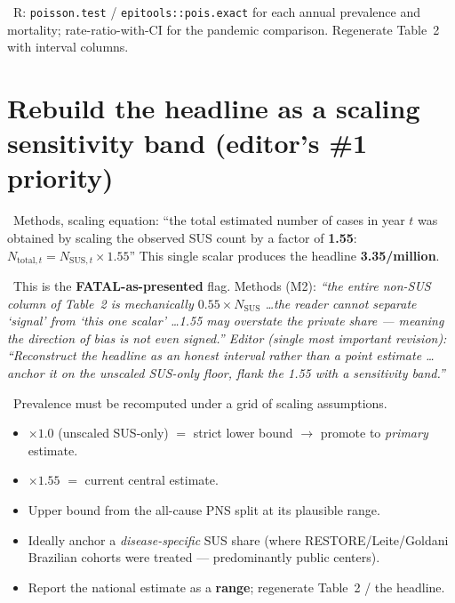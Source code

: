 \documentclass[11pt,a4paper]{article}
\newenvironment{papersays}%
  {\def\FrameCommand{{\color{rulegray}\vrule width 1.5pt}\hspace{6pt}%
     \colorbox{paperbg}}%
   \MakeFramed{\advance\hsize-\width \FrameRestore}\small}%
  {\endMakeFramed}
\newenvironment{refereesays}%
  {\def\FrameCommand{{\color{rulegray}\vrule width 1.5pt}\hspace{6pt}%
     \colorbox{refbg}}%
   \MakeFramed{\advance\hsize-\width \FrameRestore}\small\itshape}%
  {\endMakeFramed}
\begin{document}
\opHead\ R: \texttt{poisson.test} / \texttt{epitools::pois.exact} for each annual prevalence
and mortality; rate-ratio-with-CI for the pandemic comparison. Regenerate Table~2 with
interval columns.

\section{Rebuild the headline as a scaling sensitivity band (editor's \#1 priority)}

\papersaysHead\ Methods, scaling equation:
\begin{papersays}
``the total estimated number of cases in year $t$ was obtained by scaling the observed SUS
count by a factor of \textbf{1.55}:\quad $N_{\text{total},t} = N_{\text{SUS},t} \times 1.55$''
\end{papersays}
This single scalar produces the headline \textbf{3.35/million}.

\ This is the \textbf{FATAL-as-presented} flag. Methods (M2):
\begin{refereesays}
``the entire non-SUS column of Table~2 is mechanically $0.55 \times N_{\text{SUS}}$ \ldots the
reader cannot separate `signal' from `this one scalar' \ldots 1.55 may \textit{overstate} the
private share --- meaning the direction of bias is not even signed.''
\end{refereesays}
Editor (single most important revision):
\begin{refereesays}
``Reconstruct the headline as an \textit{honest interval rather than a point estimate} \ldots
anchor it on the unscaled SUS-only floor, flank the 1.55 with a sensitivity band.''
\end{refereesays}

\whyHead\ Prevalence must be recomputed under a grid of scaling assumptions.

\opHead
\begin{itemize}[leftmargin=*, topsep=2pt]
  \item $\times 1.0$ (unscaled SUS-only) $=$ strict lower bound $\rightarrow$ promote to
        \textit{primary} estimate.
  \item $\times 1.55$ $=$ current central estimate.
  \item Upper bound from the all-cause PNS split at its plausible range.
  \item Ideally anchor a \textit{disease-specific} SUS share (where RESTORE/Leite/Goldani
        Brazilian cohorts were treated --- predominantly public centers).
  \item Report the national estimate as a \textbf{range}; regenerate Table~2 / the headline.
\end{itemize}
\end{document}
